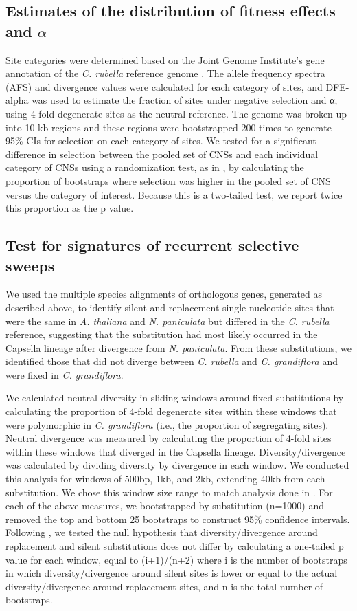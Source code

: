 \subsection{Estimates of the distribution of fitness effects and $\alpha$}
Site categories were determined based on the Joint Genome Institute’s gene annotation of the \textit{C. rubella} reference genome \citep{Slotte2013-py}. The allele frequency spectra (AFS) and divergence values were calculated for each category of sites, and DFE-alpha \citep{keightley2007,Eyre-Walker2009-zt} was used to estimate the fraction of sites under negative selection and α, using 4-fold degenerate sites as the neutral reference. The genome was broken up into 10 kb regions and these regions were bootstrapped 200 times to generate 95\% CIs for selection on each category of sites. We tested for a significant difference in selection between the pooled set of CNSs and each individual category of CNSs using a randomization test, as in \citet{Eyre-Walker2009-zt}, by calculating the proportion of bootstraps where selection was higher in the pooled set of CNS versus the category of interest. Because this is a two-tailed test, we report twice this proportion as the p value. 

\subsection{Test for signatures of recurrent selective sweeps}
We used the multiple species alignments of orthologous genes, generated as described above, to identify silent and replacement single-nucleotide sites that were the same in \textit{A. thaliana} and \textit{N. paniculata} but differed in the \textit{C. rubella} reference, suggesting that the substitution had most likely occurred in the Capsella lineage after divergence from \textit{N. paniculata}. From these substitutions, we identified those that did not diverge between \textit{C. rubella} and \textit{C. grandiflora} and were fixed in \textit{C. grandiflora}.

We calculated neutral diversity in sliding windows around fixed substitutions by calculating the proportion of 4-fold degenerate sites within these windows that were polymorphic in \textit{C. grandiflora} (i.e., the proportion of segregating sites). Neutral divergence was measured by calculating the proportion of 4-fold sites within these windows that diverged in the Capsella lineage. Diversity/divergence was calculated by dividing diversity by divergence in each window. We conducted this analysis for windows of 500bp, 1kb, and 2kb, extending 40kb from each substitution. We chose this window size range to match analysis done in \citet{Sattath2011-ns}. For each of the above measures, we bootstrapped by substitution (n=1000) and removed the top and bottom 25 bootstraps to construct 95\% confidence intervals. Following \citet{hernandez2011}, we tested the null hypothesis that diversity/divergence around replacement and silent substitutions does not differ by calculating a one-tailed p value for each window, equal to (i+1)/(n+2) where i is the number of bootstraps in which diversity/divergence around silent sites is lower or equal to the actual diversity/divergence around replacement sites, and n is the total number of bootstraps.

